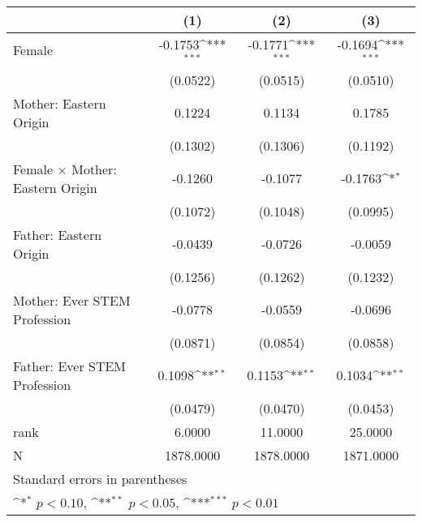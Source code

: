 {
\def\sym#1{\ifmmode^{#1}\else\(^{#1}\)\fi}
\begin{tabular}{l*{3}{c}}
\toprule
                    &\multicolumn{1}{c}{(1)}         &\multicolumn{1}{c}{(2)}         &\multicolumn{1}{c}{(3)}         \\
\midrule
Female              &     -0.1753\sym{***}&     -0.1771\sym{***}&     -0.1694\sym{***}\\
                    &    (0.0522)         &    (0.0515)         &    (0.0510)         \\
\addlinespace
Mother: Eastern Origin&      0.1224         &      0.1134         &      0.1785         \\
                    &    (0.1302)         &    (0.1306)         &    (0.1192)         \\
\addlinespace
Female $\times$ Mother: Eastern Origin&     -0.1260         &     -0.1077         &     -0.1763\sym{*}  \\
                    &    (0.1072)         &    (0.1048)         &    (0.0995)         \\
\addlinespace
Father: Eastern Origin&     -0.0439         &     -0.0726         &     -0.0059         \\
                    &    (0.1256)         &    (0.1262)         &    (0.1232)         \\
\addlinespace
Mother: Ever STEM Profession&     -0.0778         &     -0.0559         &     -0.0696         \\
                    &    (0.0871)         &    (0.0854)         &    (0.0858)         \\
\addlinespace
Father: Ever STEM Profession&      0.1098\sym{**} &      0.1153\sym{**} &      0.1034\sym{**} \\
                    &    (0.0479)         &    (0.0470)         &    (0.0453)         \\
\midrule
rank                &      6.0000         &     11.0000         &     25.0000         \\
N                   &   1878.0000         &   1878.0000         &   1871.0000         \\
\bottomrule
\multicolumn{4}{l}{\footnotesize Standard errors in parentheses}\\
\multicolumn{4}{l}{\footnotesize \sym{*} \(p<0.10\), \sym{**} \(p<0.05\), \sym{***} \(p<0.01\)}\\
\end{tabular}
}

